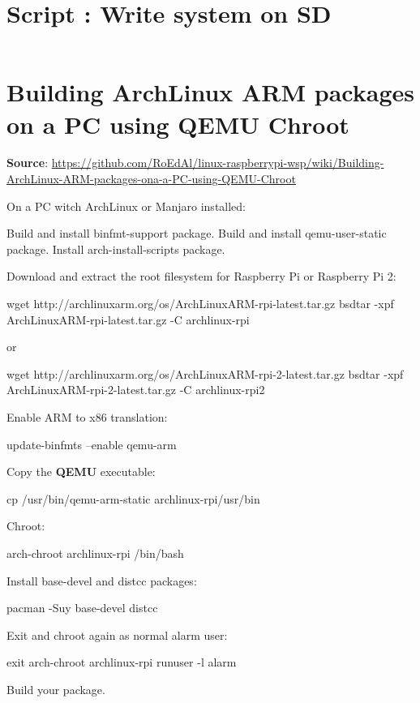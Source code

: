 \documentclass[11pt,a4paper,oneside]{report}
\begin{document}
\begin{appendices}
  \chapter{Script : Write system on SD}\label{write_system_sd}

  \inputminted[xleftmargin=20pt, linenos=true, breaklines=true, frame=single, framesep=6pt, tabsize=2, fontfamily=courier, fontsize=\small]{bash}{../../write_system_on_sd.sh}
  
  \chapter{Building ArchLinux ARM packages on a PC using QEMU Chroot}\label{archlinux_arm_qemu_chroot}
  
\textbf{Source}: \url{https://github.com/RoEdAl/linux-raspberrypi-wsp/wiki/Building-ArchLinux-ARM-packages-ona-a-PC-using-QEMU-Chroot}

On a PC witch ArchLinux or Manjaro installed:

Build and install binfmt-support package.
Build and install qemu-user-static package.
Install arch-install-scripts package.

Download and extract the root filesystem for Raspberry Pi or Raspberry Pi 2:

\begin{bashcode}
wget http://archlinuxarm.org/os/ArchLinuxARM-rpi-latest.tar.gz   
bsdtar -xpf ArchLinuxARM-rpi-latest.tar.gz -C archlinux-rpi
\end{bashcode}

or

\begin{bashcode}
wget http://archlinuxarm.org/os/ArchLinuxARM-rpi-2-latest.tar.gz   
bsdtar -xpf ArchLinuxARM-rpi-2-latest.tar.gz -C archlinux-rpi2
\end{bashcode}

Enable ARM to x86 translation:

\begin{bashcode}    
update-binfmts --enable qemu-arm
\end{bashcode}


Copy the \textbf{QEMU} executable:

\begin{bashcode}
cp /usr/bin/qemu-arm-static archlinux-rpi/usr/bin
\end{bashcode}


Chroot:

\begin{bashcode}
arch-chroot archlinux-rpi /bin/bash
\end{bashcode}


Install base-devel and distcc packages:

\begin{bashcode}
pacman -Suy base-devel distcc
\end{bashcode}


Exit and chroot again as normal alarm user:

\begin{bashcode}
exit
arch-chroot archlinux-rpi runuser -l alarm
\end{bashcode}


Build your package.

\end{appendices}
\end{document}
